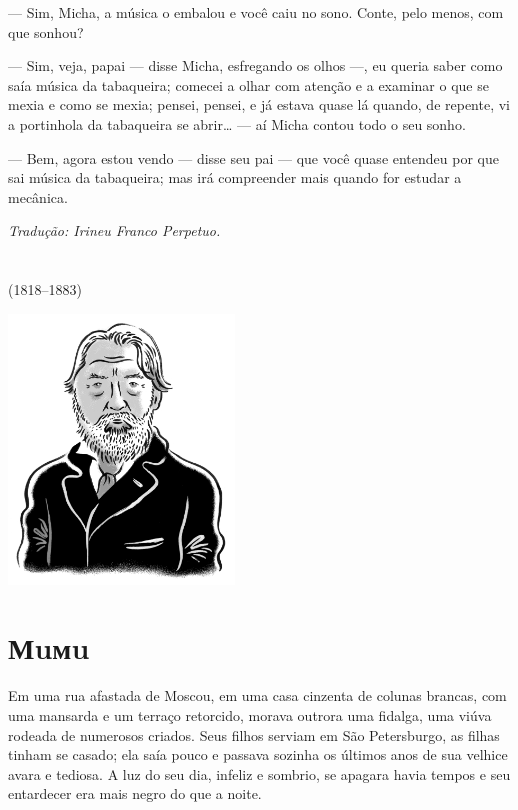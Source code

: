 --- Sim, Micha, a música o embalou e você caiu no sono. Conte, pelo
menos, com que sonhou?

--- Sim, veja, papai --- disse Micha, esfregando os olhos ---, eu queria
saber como saía música da tabaqueira; comecei a olhar com atenção e a
examinar o que se mexia e como se mexia; pensei, pensei, e já estava
quase lá quando, de repente, vi a portinhola da tabaqueira se abrir\ldots{}
--- aí Micha contou todo o seu sonho.

--- Bem, agora estou vendo --- disse seu pai --- que você quase entendeu
por que sai música da tabaqueira; mas irá compreender mais quando for
estudar a mecânica.

\medskip

{\footnotesize\hfill\emph{Tradução: Irineu Franco Perpetuo.}}

\chapter*{}
\label{part3}
\thispagestyle{empty}

\begin{vplace}[1.5]
{\HUGES\hfill{}}

{\LARGE\hfill\textlt(1818–1883)}
\end{vplace}

\pagebreak
\thispagestyle{empty}
\mbox{}
\vfill
\begin{center}
\includegraphics[width=6cm]{./imgs/autor3.jpg}
\end{center}

\chapter{Мuмu}


Em uma rua afastada de Moscou, em uma casa cinzenta de colunas brancas,
com uma mansarda e um terraço retorcido, morava outrora uma fidalga, uma
viúva rodeada de numerosos criados. Seus filhos serviam em São
Petersburgo, as filhas tinham se casado; ela saía pouco e passava
sozinha os últimos anos de sua velhice avara e tediosa. A luz do seu
dia, infeliz e sombrio, se apagara havia tempos e seu entardecer era
mais negro do que a noite.


